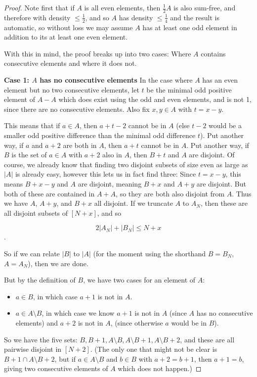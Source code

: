 \documentclass{article}
\theoremstyle{definition}
\theoremstyle{remark}
\numberwithin{equation}{section}
\begin{document}
\begin{proof}
Note first that if $A$ is all even elements, then $\frac12 A$ is
also sum-free, and therefore with density $\leq \frac12$, and so $A$
has density $\leq \frac14$ and the result is automatic, so without
loss we may assume $A$ has at least one odd element in addition to its
at least one even element.  

With this in mind, the proof breaks up into two cases: Where $A$
contains consecutive elements and where it does not.

\textbf{Case 1: $A$ has no consecutive elements} In the case where $A$
has an even element but no two consecutive elements, let $t$ be the
minimal odd positive element of $A-A$ which does exist using the odd
and even elements, and is not 1, since there are no consecutive
elements.  Also fix $x, y \in A$ with $t = x-y$.

This means that if $a \in A$, then $a+t-2$ cannot be in $A$ (else
$t-2$ would be a smaller odd positive difference than the minimal odd
difference $t$).  Put another way, if $a$ and $a+2$ are both in $A$,
then $a+t$ cannot be in $A$.  Put another way, if $B$ is the set of
$a \in A$ with $a+2$ also in $A$, then $B+t$ and $A$ are disjoint.  Of
course, we already know that finding two disjoint subsets of size even
as large as $|A|$ is already easy, however this lets us in fact find
three: Since $t=x-y$, this means $B+x-y$ and $A$ are disjoint, meaning
$B+x$ and $A+y$ are disjoint.  But both of these are contained in
$A+A$, so they are both also disjoint from $A$.  Thus we have $A$,
$A+y$, and $B+x$ all disjoint.  If we truncate $A$ to $A_N$, then
these are all disjoint subsets of $[N+x]$, and so

\[2|A_N|+|B_N| \leq N+x\].

So if we can relate $|B|$ to $|A|$ (for the moment using the shorthand
$B = B_N$, $A = A_N$), then we are done.  

But by the definition of $B$, we have two cases for an element of $A$: 
\begin{itemize}
\item $a \in B$, in which case $a+1$ is not in $A$.  
\item $a \in A\setminus B$, in which case we know $a+1$ is not in $A$
  (since $A$ has no consecutive elements) and $a+2$ is not in $A$,
  (since otherwise $a$ would be in $B$).
\end{itemize}

So we have the five sets:
$B, B+1, A\setminus B, A\setminus B + 1, A\setminus B + 2$, and these
are all pairwise disjoint in $[N+2]$.  (The only one that might not be
clear is $B+1 \cap A \setminus B + 2$, but if $a \in A\setminus B$ and
$b \in B$ with $a+2=b+1$, then $a + 1 = b$, giving two consecutive
elements of $A$ which does not happen.)


\end{proof}
\end{document}
